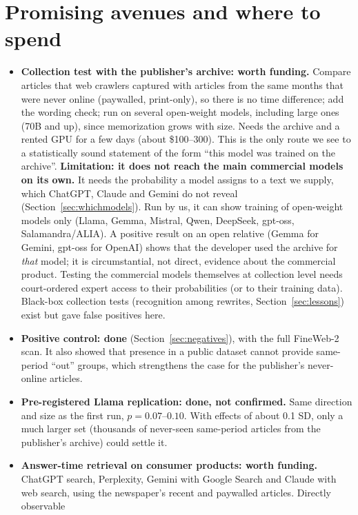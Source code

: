 \documentclass[10pt,a4paper]{article}
\begin{document}
\section{Promising avenues and where to spend}\label{sec:avenues}
\begin{itemize}
\item \textbf{Collection test with the publisher's archive: worth funding.} Compare articles that web crawlers
captured with articles from the same months that were never online (paywalled, print-only), so there is no time
difference; add the wording check; run on several open-weight models, including large ones (70B and up), since
memorization grows with size. Needs the archive and a rented GPU for a few days (about \$100--300). This is the only
route we see to a statistically sound statement of the form ``this model was trained on the archive''.
\textbf{Limitation: it does not reach the main commercial models on its own.} It needs the probability a model
assigns to a text we supply, which ChatGPT, Claude and Gemini do not reveal (Section~\ref{sec:whichmodels}). Run by
us, it can show training of open-weight models only (Llama, Gemma, Mistral, Qwen, DeepSeek, gpt-oss, Salamandra/ALIA).
A positive result on an open relative (Gemma for Gemini, gpt-oss for OpenAI) shows that the developer used the
archive for \emph{that} model; it is circumstantial, not direct, evidence about the commercial product. Testing the
commercial models themselves at collection level needs court-ordered expert access to their probabilities (or to
their training data). Black-box collection tests (recognition among rewrites, Section~\ref{sec:lessons}) exist but
gave false positives here.
\item \textbf{Positive control: done} (Section~\ref{sec:negatives}), with the full FineWeb-2 scan. It also showed
that presence in a public dataset cannot provide same-period ``out'' groups, which strengthens the case for the
publisher's never-online articles.
\item \textbf{Pre-registered Llama replication: done, not confirmed.} Same direction and size as the first run,
$p=0.07$--$0.10$. With effects of about 0.1 SD, only a much larger set (thousands of never-seen same-period
articles from the publisher's archive) could settle it.
\item \textbf{Answer-time retrieval on consumer products: worth funding.} ChatGPT search, Perplexity, Gemini with
Google Search and Claude with web search, using the newspaper's recent and paywalled articles. Directly observable

\end{itemize}
\end{document}

